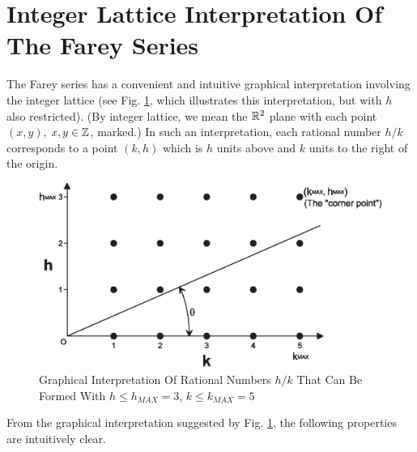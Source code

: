 \section[Integer Lattice Interpretation]
        {Integer Lattice Interpretation Of The Farey Series}

The Farey series has a convenient and intuitive graphical interpretation
involving the integer lattice%
(see Fig. \ref{fig:cfry0:ili0:00},
which illustrates this interpretation, but with $h$
also restricted).
(By integer lattice, we mean the ${\mathbb{R}}{}^2$ plane
with each point $(x,y)$, $x,y \in {\mathbb{Z}}$, marked.)
In such an interpretation, each rational number $h/k$ corresponds to
a point $(k,h)$ which is $h$ units above and $k$ units 
to the right of the origin.

\begin{figure}
\centering
\includegraphics[width=4.6in]{c_fry0/farey01a.eps}
\caption{Graphical Interpretation Of Rational Numbers 
         $h/k$ That Can Be Formed With $h \leq h_{MAX}=3$, $k \leq k_{MAX}=5$}
\label{fig:cfry0:ili0:00}
\end{figure}

From the graphical interpretation suggested by Fig. \ref{fig:cfry0:ili0:00},
the following properties are intuitively clear.

